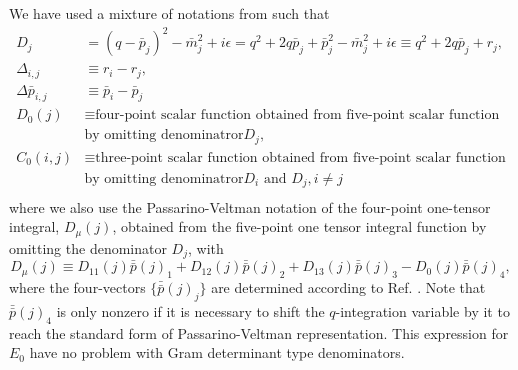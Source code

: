 We have used a mixture of notations from \cite{PV,WJ,DD,DD1} such that
\begin{align}
D_j&=(q-\bar{p}_j)^2-\bar{m}^2_j+i\epsilon=q^2+2q\bar{p}_j+\bar{p}^2_j-\bar{m}^2_j+i\epsilon\equiv q^2+2q\bar{p}_j+r_j,\nonumber\\
\Delta_{i,j}&\equiv r_i-r_j,\nonumber\\
\Delta\bar{p}_{i,j}&\equiv\bar{p}_i-\bar{p}_j\nonumber\\
D_0(j)&\equiv\text{four-point scalar function obtained from five-point scalar function}\nonumber\\
&\text{by omitting denominatror} D_j,\nonumber\\
C_0(i,j)&\equiv\text{three-point scalar function obtained from five-point scalar function}\nonumber\\
	&\text{by omitting denominatror} D_i \text{ and } D_j, i\neq j \nonumber\\
\end{align}
where we also use the Passarino-Veltman \cite{PV} notation of the four-point one-tensor integral, $D_\mu(j)$, obtained from the five-point one tensor integral function by omitting the denominator $D_j$, with
$$D_\mu(j)\equiv D_{11}(j)\bar{\bar{p}}(j)_1+D_{12}(j)\bar{\bar{p}}(j)_2+D_{13}(j)\bar{\bar{p}}(j)_3-D_{0}(j)\bar{\bar{p}}(j)_4,
$$
where the four-vectors $\{\bar{\bar{p}}(j)_j\}$ are determined according to Ref. \cite{PV}. Note that $\bar{\bar{p}}(j)_4$ is only nonzero if it is necessary to shift the $q$-integration variable by it to reach the standard form of Passarino-Veltman representation. This expression for $E_0$ have no problem with Gram determinant type denominators.



